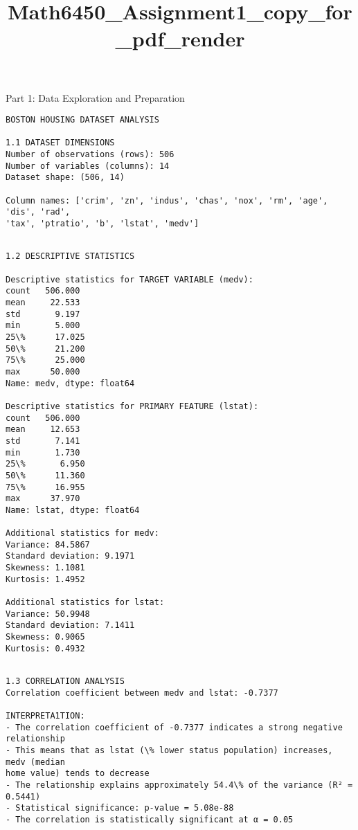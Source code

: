 \documentclass[11pt, twocolumn]{article}
\title{Math6450\_Assignment1\_copy\_for\_pdf\_render}
\begin{document}
    
    \maketitle
    
    

    
    Part 1: Data Exploration and Preparation

    \begin{Verbatim}[commandchars=\\\{\}]
BOSTON HOUSING DATASET ANALYSIS

1.1 DATASET DIMENSIONS
Number of observations (rows): 506
Number of variables (columns): 14
Dataset shape: (506, 14)

Column names: ['crim', 'zn', 'indus', 'chas', 'nox', 'rm', 'age', 'dis', 'rad',
'tax', 'ptratio', 'b', 'lstat', 'medv']
    \end{Verbatim}

    \begin{Verbatim}[commandchars=\\\{\}]

1.2 DESCRIPTIVE STATISTICS

Descriptive statistics for TARGET VARIABLE (medv):
count   506.000
mean     22.533
std       9.197
min       5.000
25\%      17.025
50\%      21.200
75\%      25.000
max      50.000
Name: medv, dtype: float64

Descriptive statistics for PRIMARY FEATURE (lstat):
count   506.000
mean     12.653
std       7.141
min       1.730
25\%       6.950
50\%      11.360
75\%      16.955
max      37.970
Name: lstat, dtype: float64

Additional statistics for medv:
Variance: 84.5867
Standard deviation: 9.1971
Skewness: 1.1081
Kurtosis: 1.4952

Additional statistics for lstat:
Variance: 50.9948
Standard deviation: 7.1411
Skewness: 0.9065
Kurtosis: 0.4932
    \end{Verbatim}

    \begin{Verbatim}[commandchars=\\\{\}]

1.3 CORRELATION ANALYSIS
Correlation coefficient between medv and lstat: -0.7377

INTERPRETA1TION:
- The correlation coefficient of -0.7377 indicates a strong negative
relationship
- This means that as lstat (\% lower status population) increases, medv (median
home value) tends to decrease
- The relationship explains approximately 54.4\% of the variance (R² = 0.5441)
- Statistical significance: p-value = 5.08e-88
- The correlation is statistically significant at α = 0.05
    \end{Verbatim}
\end{document}
